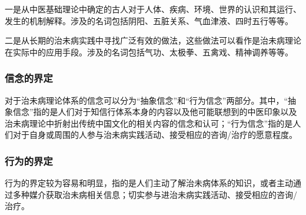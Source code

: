 一是从中医基础理论中确定的古人对于人体、疾病、环境、世界的认识和其运行、发生的机制解释。涉及的名词包括阴阳、五脏关系、气血津液、四时五行等等。

二是从长期的治未病实践中寻找广泛有效的做法，这些做法可以看作是治未病理论在实际中的应用手段。涉及的名词包括气功、太极拳、五禽戏、精神调养等等。

\subsubsection{信念的界定}
对于治未病理论体系的信念可以分为“抽象信念”和“行为信念”两部分。其中，“抽象信念”指的是人们对于知信行体系本身的内容以及他可能联想到的中医印象以及治未病理论中折射出传统中国文化的相关内容的信念和认可；“行为信念”指的是人们对于自身或周围的人参与治未病实践活动、接受相应的咨询/治疗的愿意程度。
\subsubsection{行为的界定}
行为的界定较为容易和明显，指的是人们主动了解治未病体系的知识，或者主动通过多种媒介获取治未病相关信息；切实参与进治未病实践活动、接受相应的咨询/治疗。



